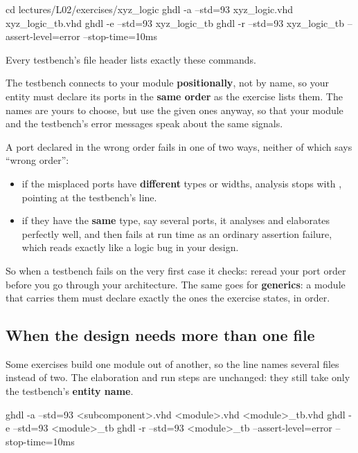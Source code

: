 \begin{shell}
cd lectures/L02/exercises/xyz_logic
ghdl -a --std=93 xyz_logic.vhd xyz_logic_tb.vhd
ghdl -e --std=93 xyz_logic_tb
ghdl -r --std=93 xyz_logic_tb --assert-level=error --stop-time=10ms
\end{shell}

Every testbench's file header lists exactly these commands.

The testbench connects to your module \textbf{positionally}, not by name, so your entity must
declare its ports in the \textbf{same order} as the exercise lists them. The names are yours to
choose, but use the given ones anyway, so that your module and the testbench's error messages speak
about the same signals.

A port declared in the wrong order fails in one of two ways, neither of which says ``wrong order'':
\begin{itemize}
  \item if the misplaced ports have \textbf{different} types or widths, analysis stops with
    , pointing at the testbench's  line.
  \item if they have the \textbf{same} type, say several  ports, it analyses and
    elaborates perfectly well, and then fails at run time as an ordinary assertion failure, which
    reads exactly like a logic bug in your design.
\end{itemize}

So when a testbench fails on the very first case it checks: reread your port order before you go
through your architecture. The same goes for \textbf{generics}: a module that carries them must
declare exactly the ones the exercise states, in order.

\subsection{When the design needs more than one file}
\label{c2:sub:multifile}
Some exercises build one module out of another, so the  line names several files
instead of two. The elaboration and run steps are unchanged: they still take only the testbench's
\textbf{entity name}.

\begin{shell}
ghdl -a --std=93 <subcomponent>.vhd <module>.vhd <module>_tb.vhd
ghdl -e --std=93 <module>_tb
ghdl -r --std=93 <module>_tb --assert-level=error --stop-time=10ms
\end{shell}

